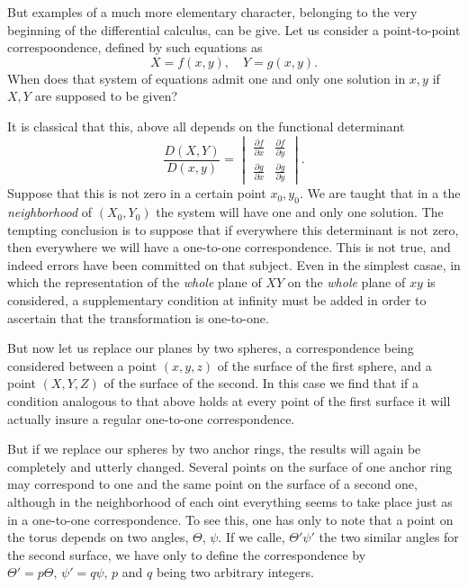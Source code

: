 \documentclass[12pt,oneside]{book}
\begin{document}
But examples of a much more elementary character, belonging to the very beginning of the differential calculus, can be give. Let us consider a point-to-point correspoondence, defined by such equations as 
$$X=f(x,y),\quad Y=g(x,y).$$
When does that system of equations admit one and only one solution in $x,y$ if $X, Y$ are supposed to be given? \par 

It is classical that this, above all depends on the functional determinant 
$$\frac{D(X,Y)}{D(x,y)}=
    \begin{vmatrix}
        \frac{\partial f}{\partial x} & \frac{\partial f}{\partial y} \\[0.3em]
        \frac{\partial g}{\partial x} & \frac{\partial g}{\partial y}
    \end{vmatrix}. $$
Suppose that this is not zero in a certain point $x_0,y_0$. We are taught that in a the \textit{neighborhood} of $(X_0,Y_0)$ the system will have one and only one solution. The tempting conclusion is to suppose that if everywhere this determinant is not zero, then everywhere we will have a one-to-one correspondence. This is not true, and indeed errors have been committed on that subject. Even in the simplest casae, in which the representation of the \textit{whole} plane of $XY$ on the \textit{whole} plane of $xy$ is considered, a supplementary condition at infinity must be added in order to ascertain that the transformation is one-to-one. \par 

But now let us replace our planes by two spheres, a correspondence being considered between a point $(x,y,z)$ of the surface of the first sphere, and a point $(X,Y,Z)$ of the surface of the second. In this case we find that if a condition analogous to that above holds at every point of the first surface it will actually insure a regular one-to-one correspondence. \par 

But if we replace our spheres by two anchor rings, the results will again be completely and utterly changed. Several points on the surface of one anchor ring may correspond to one and the same point on the surface of a second one, although in the neighborhood of each oint everything seems to take place just as in a one-to-one correspondence. To see this, one has only to note that a point on the torus depends on two angles, $\Theta$, $\psi$. If we calle, $\Theta'\psi'$ the two similar angles for the second surface, we have only to define the correspondence by $\Theta'=p\Theta,\, \psi'=q\psi,\, p$ and $q$ being two arbitrary integers.\footnotemark
\end{document}
